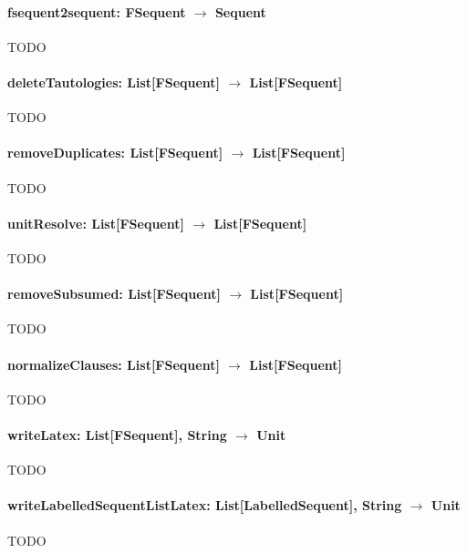 \documentclass[a4paper, 11pt]{report}
\begin{document}
\paragraph{\textbf{fsequent2sequent: FSequent $\rightarrow$ Sequent}}
{\color{red}TODO}

\paragraph{\textbf{deleteTautologies: List[FSequent] $\rightarrow$ List[FSequent]}}
{\color{red}TODO}

\paragraph{\textbf{removeDuplicates: List[FSequent] $\rightarrow$ List[FSequent]}}
{\color{red}TODO}

\paragraph{\textbf{unitResolve: List[FSequent] $\rightarrow$ List[FSequent]}}
{\color{red}TODO}

\paragraph{\textbf{removeSubsumed: List[FSequent] $\rightarrow$ List[FSequent]}}
{\color{red}TODO}

\paragraph{\textbf{normalizeClauses: List[FSequent] $\rightarrow$ List[FSequent]}}
{\color{red}TODO}

\paragraph{\textbf{writeLatex: List[FSequent], String $\rightarrow$ Unit}}
{\color{red}TODO}

\paragraph{\textbf{writeLabelledSequentListLatex: List[LabelledSequent], String $\rightarrow$ Unit}}
{\color{red}TODO}



\end{document}
